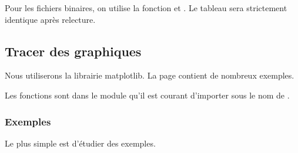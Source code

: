 \documentclass[letterpaper,10pt,english]{sphinxhowto}
\begin{document}
\begin{sphinxVerbatim}[commandchars=\\\{\}]
[0.43478261 0.44444444 0.42857143]
\end{sphinxVerbatim}

\sphinxAtStartPar
Pour les fichiers binaires, on utilise la fonction  et . Le tableau sera strictement identique après relecture.

\begin{sphinxVerbatim}[commandchars=\\\{\}]
  \PYG{p}{[}  \PYG{p}{]}
 
  
\end{sphinxVerbatim}

\begin{sphinxVerbatim}[commandchars=\\\{\}]
[1 2 4]
\end{sphinxVerbatim}


\subsection{Tracer des graphiques}
\label{\detokenize{cours7_graphiques_cours:tracer-des-graphiques}}\label{\detokenize{cours7_graphiques_cours::doc}}
\sphinxAtStartPar
Nous utiliserons la librairie matplotlib. La page  contient de nombreux exemples.

\sphinxAtStartPar
Les fonctions sont dans le module  qu’il est courant d’importer sous le nom de .


\subsubsection{Exemples}
\label{\detokenize{cours7_graphiques_cours:exemples}}
\sphinxAtStartPar
Le plus simple est d’étudier des exemples.
\end{document}
